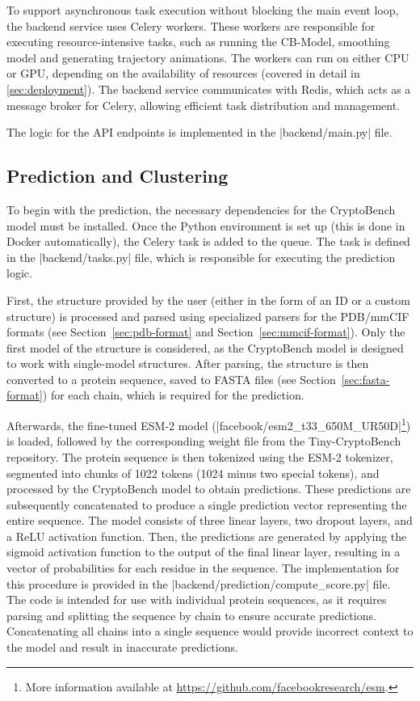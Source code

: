 To support asynchronous task execution without blocking the main event loop, the backend service uses Celery workers. These workers are responsible for executing resource-intensive tasks, such as running the CB-Model, smoothing model and generating trajectory animations. The workers can run on either CPU or GPU, depending on the availability of resources (covered in detail in \ref{sec:deployment}). The backend service communicates with Redis, which acts as a message broker for Celery, allowing efficient task distribution and management.

The logic for the API endpoints is implemented in the \inline|backend/main.py| file.

\subsection{Prediction and Clustering}
\label{sec:prediction-backend}

To begin with the prediction, the necessary dependencies for the CryptoBench model must be installed. Once the Python environment is set up (this is done in Docker automatically), the Celery task is added to the queue. The task is defined in the \inline|backend/tasks.py| file, which is responsible for executing the prediction logic.

First, the structure provided by the user (either in the form of an ID or a custom structure) is processed and parsed using specialized parsers for the PDB/mmCIF formats (see Section~\ref{sec:pdb-format} and Section~\ref{sec:mmcif-format}). Only the first model of the structure is considered, as the CryptoBench model is designed to work with single-model structures. After parsing, the structure is then converted to a protein sequence, saved to FASTA files (see Section~\ref{sec:fasta-format}) for each chain, which is required for the prediction.

Afterwards, the fine-tuned ESM-2 model (\inline|facebook/esm2_t33_650M_UR50D|\footnote{More information available at \url{https://github.com/facebookresearch/esm}.}) is loaded, followed by the corresponding weight file from the Tiny-CryptoBench repository. The protein sequence is then tokenized using the ESM-2 tokenizer, segmented into chunks of 1022 tokens (1024 minus two special tokens), and processed by the CryptoBench model to obtain predictions. These predictions are subsequently concatenated to produce a single prediction vector representing the entire sequence. The model consists of three linear layers, two dropout layers, and a ReLU activation function. Then, the predictions are generated by applying the sigmoid activation function to the output of the final linear layer, resulting in a vector of probabilities for each residue in the sequence. The implementation for this procedure is provided in the \inline|backend/prediction/compute_score.py| file. The code is intended for use with individual protein sequences, as it requires parsing and splitting the sequence by chain to ensure accurate predictions. Concatenating all chains into a single sequence would provide incorrect context to the model and result in inaccurate predictions.

